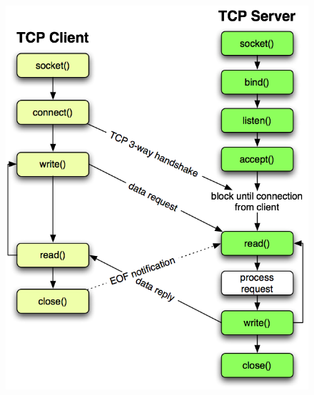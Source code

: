 \documentclass[10pt, xcolor=x11names]{beamer}
\begin{document}

\begin{frame}
	\begin{figure}
		\includegraphics[width=.55\linewidth]{img/tcplab}
	\end{figure}	
\end{frame}

\end{document}
